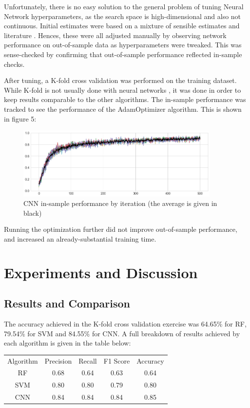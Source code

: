 \documentclass[11pt]{article}
\begin{document}
Unfortunately, there is no easy solution to the general problem of tuning Neural Network hyperparameters, as the search space is high-dimensional and also not continuous. Initial estimates were based on a mixture of sensible estimates and literature \citep{nnoptim}. Hences, these were all adjusted manually by observing network performance on out-of-sample data as hyperparameters were tweaked. This was sense-checked by confirming that out-of-sample performance reflected in-sample checks. 

After tuning, a K-fold cross validation was performed on the training dataset. While K-fold is not usually done with neural networks \citep{nnoptim}, it was done in order to keep results comparable to the other algorithms. The in-sample performance was tracked to see the performance of the AdamOptimizer algorithm. This is shown in figure 5:\\

\begin{figure}[h]
\caption{CNN in-sample performance by iteration (the average is given in black)}
\centering
\includegraphics[width=0.9\textwidth]{images/training-progress.png}
\end{figure}

Running the optimization further did not improve out-of-sample performance, and increased an already-substantial training time.

\section{Experiments and Discussion}
\subsection{Results and Comparison}

The accuracy achieved in the K-fold cross validation exercise was 64.65\% for RF, 79.54\% for SVM and 84.55\% for CNN. A full breakdown of results achieved by each algorithm is given in the table below:
\begin{center}
\begin{tabular}{ c c c c c }
 Algorithm & Precision & Recall & F1 Score & Accuracy\\ 
 RF & 0.68 & 0.64 & 0.63 & 0.64 \\  
SVM & 0.80 & 0.80 & 0.79 & 0.80\\
CNN & 0.84 & 0.84 & 0.84 & 0.85                    
\end{tabular}
\end{center}
\end{document}
